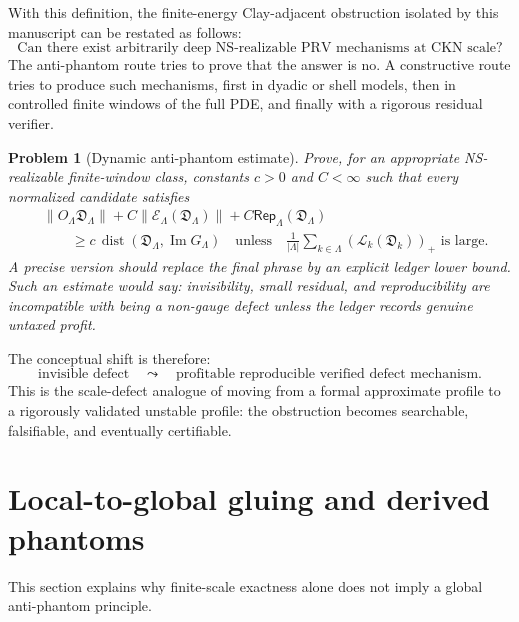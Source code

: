 \documentclass[11pt]{article}
\numberwithin{equation}{section}
\newtheorem{problem}[theorem]{Problem}
\newcommand{\pos}[1]{\left(#1\right)_+}
\newcommand{\calE}{\mathcal E}
\newcommand{\calL}{\mathcal L}
\newcommand{\Rep}{\mathsf{Rep}}
\newcommand{\Image}{\operatorname{Im}}
\newcommand{\Dist}{\operatorname{dist}}
\begin{document}
With this definition, the finite-energy Clay-adjacent obstruction isolated by this manuscript can be restated as follows:
\[
\boxed{
\text{Can there exist arbitrarily deep NS-realizable PRV mechanisms at CKN scale?}
}
\]
The anti-phantom route tries to prove that the answer is no.  A constructive route tries to produce such mechanisms, first in dyadic or shell models, then in controlled finite windows of the full PDE, and finally with a rigorous residual verifier.

\begin{problem}[Dynamic anti-phantom estimate]\label{prob:dynamic-antiphantom}
Prove, for an appropriate NS-realizable finite-window class, constants $c>0$ and $C<\infty$ such that every normalized candidate satisfies
\begin{equation}\label{eq:dynamic-antiphantom}
\begin{aligned}
    &\|O_\Lambda\mathfrak D_\Lambda\|
    + C\|\calE_\Lambda(\mathfrak D_\Lambda)\|
    + C\Rep_\Lambda(\mathfrak D_\Lambda)\\
    &\qquad\ge
    c\,\Dist(\mathfrak D_\Lambda,\Image G_\Lambda)
    \quad\text{unless}\quad
    \frac1{|\Lambda|}\sum_{k\in\Lambda}\pos{\calL_k(\mathfrak D_k)}
    \text{ is large.}
\end{aligned}
\end{equation}
A precise version should replace the final phrase by an explicit ledger lower bound.  Such an estimate would say: invisibility, small residual, and reproducibility are incompatible with being a non-gauge defect unless the ledger records genuine untaxed profit.
\end{problem}

The conceptual shift is therefore:
\[
    \boxed{
    \text{invisible defect}
    \quad\leadsto\quad
    \text{profitable reproducible verified defect mechanism}.
    }
\]
This is the scale-defect analogue of moving from a formal approximate profile to a rigorously validated unstable profile: the obstruction becomes searchable, falsifiable, and eventually certifiable.

\section{Local-to-global gluing and derived phantoms}\label{sec:local-to-global}
\noindent This section explains why finite-scale exactness alone does not imply a global anti-phantom principle.
\end{document}

